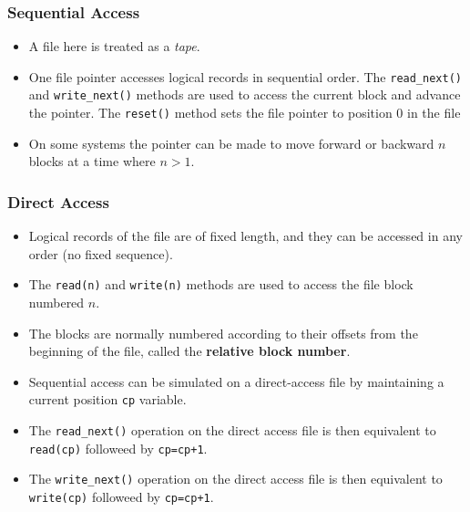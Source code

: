 \documentclass{article}
\theoremstyle{plain}
\theoremstyle{definition}
\begin{document}
\subsubsection{Sequential Access}
\begin{itemize}
    \item A file here is treated as a \textit{tape}.
    
    \item One file pointer accesses logical records in sequential order. The \texttt{read\_next()} and \texttt{write\_next()} methods are used to access the current block and advance the pointer. The \texttt{reset()} method sets the file pointer to position 0 in the file
    
    \item On some systems the pointer can be made to move forward or backward $n$ blocks at a time where $n > 1$.
\end{itemize}

\subsubsection{Direct Access}
\begin{itemize}
    \item Logical records of the file are of fixed length, and they can be accessed in any order (no fixed sequence). 
    
    \item The \texttt{read(n)} and \texttt{write(n)} methods are used to access the file block numbered $n$. 
    
    \item The blocks are normally numbered according to their offsets from the beginning of the file, called the \textbf{relative block number}. 
    
    \item Sequential access can be simulated on a direct-access file by maintaining a current position \texttt{cp} variable. 
    
    \item The \texttt{read\_next()} operation on the direct access file is then equivalent to \texttt{read(cp)} followeed by \texttt{cp=cp+1}. 
    
    \item The \texttt{write\_next()} operation on the direct access file is then equivalent to \texttt{write(cp)} followeed by \texttt{cp=cp+1}. 
\end{itemize}
\end{document}
